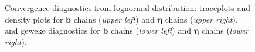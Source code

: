 \documentclass[ba]{imsart}
\numberwithin{equation}{section}
\theoremstyle{plain}
\begin{document}
\begin{figure}[H]
		\caption {Convergence diagnostics from lognormal distribution: traceplots and density plots for $\boldsymbol{b}$ chains (\textit{upper left}) and $\boldsymbol{\eta}$ chains (\textit{upper right}), and geweke diagnostics for $\boldsymbol{b}$ chains (\textit{lower left}) and $\boldsymbol{\eta}$ chains (\textit{lower right}).}
		\label{figure:convergencediag}
	\end{figure}

\begin{supplement}
\label{suppA} 
\end{supplement}




\end{document}
